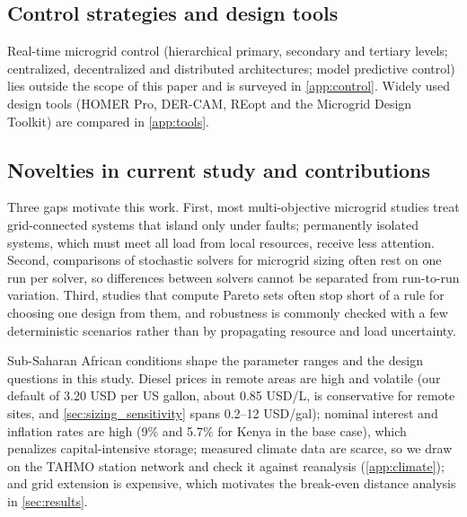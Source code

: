 \documentclass[final,3p,times]{elsarticle}
\begin{document}
\subsection{Control strategies and design tools \label{sec:control_survey}\label{app:design_tools}}
Real-time microgrid control (hierarchical primary, secondary and tertiary levels; centralized, decentralized and distributed architectures; model predictive control) lies outside the scope of this paper and is surveyed in \cref{app:control}. Widely used design tools (HOMER Pro, DER-CAM, REopt and the Microgrid Design Toolkit) are compared in \cref{app:tools}.

\subsection{Novelties in current study and contributions}

Three gaps motivate this work. First, most multi-objective microgrid studies treat grid-connected systems that island only under faults; permanently isolated systems, which must meet all load from local resources, receive less attention. Second, comparisons of stochastic solvers for microgrid sizing often rest on one run per solver, so differences between solvers cannot be separated from run-to-run variation. Third, studies that compute Pareto sets often stop short of a rule for choosing one design from them, and robustness is commonly checked with a few deterministic scenarios rather than by propagating resource and load uncertainty.

Sub-Saharan African conditions shape the parameter ranges and the design questions in this study. Diesel prices in remote areas are high and volatile (our default of 3.20 USD per US gallon, about 0.85 USD/L, is conservative for remote sites, and \cref{sec:sizing_sensitivity} spans 0.2--12 USD/gal); nominal interest and inflation rates are high (9\% and 5.7\% for Kenya in the base case), which penalizes capital-intensive storage; measured climate data are scarce, so we draw on the TAHMO station network and check it against reanalysis (\cref{app:climate}); and grid extension is expensive, which motivates the break-even distance analysis in \cref{sec:results}.
\end{document}
